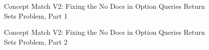 \begin{figure}
\centering
\vspace{1.0in}
\caption{Concept Match V2: Fixing the No Docs in Option Queries Return Sets Problem, Part 1}
\label{fig:concept_match_v2_financial_statement_fraud_9_1}
\end{figure}

\begin{figure}
\centering
\vspace{1.0in}
\caption{Concept Match V2: Fixing the No Docs in Option Queries Return Sets Problem, Part 2}
\label{fig:concept_match_v2_financial_statement_fraud_9_2}
\end{figure}

